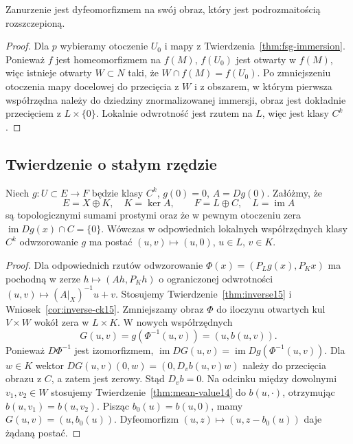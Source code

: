 \begin{stwierdzenie}
\label{prop:fsg-embedding-image}
Zanurzenie jest dyfeomorfizmem na swój obraz, który jest
podrozmaitością rozszczepioną.
\end{stwierdzenie}
\begin{proof}
Dla $p$ wybieramy otoczenie $U_0$ i mapy z
Twierdzenia~\ref{thm:fsg-immersion}.
Ponieważ $f$ jest homeomorfizmem na $f(M)$,
$f(U_0)$ jest otwarty w $f(M)$, więc istnieje otwarty
$W\subset N$ taki, że $W\cap f(M)=f(U_0)$.
Po zmniejszeniu otoczenia mapy docelowej do przecięcia
z $W$ i z obszarem, w którym pierwsza współrzędna należy
do dziedziny znormalizowanej immersji, obraz jest dokładnie
przecięciem z $L\times\{0\}$. Lokalnie odwrotność
jest rzutem na $L$, więc jest klasy $C^k$.
\end{proof}

\subsection{Twierdzenie o stałym rzędzie}

\begin{twierdzenie}
\label{thm:fsg-split-constant-rank}
Niech $g:U\subset E\to F$ będzie klasy $C^k$,
$g(0)=0$, $A=Dg(0)$. Załóżmy, że
\[
 E=X\oplus K,\quad K=\ker A,\qquad
 F=L\oplus C,\quad L=\operatorname{im}A
\]
są topologicznymi sumami prostymi oraz że w pewnym
otoczeniu zera $\operatorname{im}Dg(x)\cap C=\{0\}$.
Wówczas w odpowiednich lokalnych współrzędnych klasy
$C^k$ odwzorowanie $g$ ma postać $(u,v)\mapsto(u,0)$,
$u\in L$, $v\in K$.
\end{twierdzenie}
\begin{proof}
Dla odpowiednich rzutów odwzorowanie
$\Phi(x)=(P_Lg(x),P_Kx)$ ma pochodną w zerze
$h\mapsto(Ah,P_Kh)$ o ograniczonej odwrotności
$(u,v)\mapsto(A|_X)^{-1}u+v$. Stosujemy
Twierdzenie~\ref{thm:inverse15} i Wniosek~\ref{cor:inverse-ck15}.
Zmniejszamy obraz $\Phi$ do iloczynu otwartych kul
$V\times W$ wokół zera w $L\times K$.
W nowych współrzędnych
\[
 G(u,v)=g(\Phi^{-1}(u,v))=(u,b(u,v)).
\]
Ponieważ $D\Phi^{-1}$ jest izomorfizmem,
$\operatorname{im}DG(u,v)=\operatorname{im}Dg(\Phi^{-1}(u,v))$.
Dla $w\in K$ wektor $DG(u,v)(0,w)=(0,D_vb(u,v)w)$
należy do przecięcia obrazu z $C$, a zatem jest zerowy.
Stąd $D_vb=0$. Na odcinku między dowolnymi $v_1,v_2\in W$
stosujemy Twierdzenie~\ref{thm:mean-value14} do $b(u,\cdot)$,
otrzymując $b(u,v_1)=b(u,v_2)$.
Pisząc $b_0(u)=b(u,0)$, mamy $G(u,v)=(u,b_0(u))$.
Dyfeomorfizm $(u,z)\mapsto(u,z-b_0(u))$ daje żądaną postać.
\end{proof}

